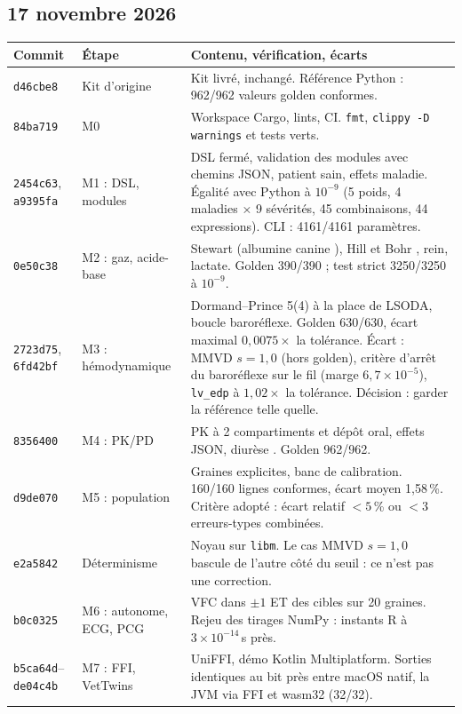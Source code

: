 \documentclass[11pt,a4paper]{article}
\newcommand{\commit}[1]{\texttt{\small #1}}
\newcommand{\ecart}[1]{\textcolor{red!60!black}{#1}}
\begin{document}
\subsection*{17 novembre 2026}
\begin{longtable}{@{}p{1.5cm}p{4.2cm}p{10.3cm}@{}}
\toprule
\textbf{Commit} & \textbf{Étape} & \textbf{Contenu, vérification, écarts}\\
\midrule\endhead
\commit{d46cbe8} & Kit d'origine & Kit livré, inchangé. Référence Python : 962/962 valeurs golden conformes.\\
\commit{84ba719} & M0 & Workspace Cargo, lints, CI. \texttt{fmt}, \texttt{clippy -D warnings} et tests verts.\\
\commit{2454c63}, \commit{a9395fa} & M1 : DSL, modules & DSL fermé, validation des modules avec chemins JSON, patient sain, effets maladie. Égalité avec Python à $10^{-9}$ (5 poids, 4 maladies × 9 sévérités, 45 combinaisons, 44 expressions). CLI : 4161/4161 paramètres.\\
\commit{0e50c38} & M2 : gaz, acide-base & Stewart (albumine canine \citep{constable2005}), Hill et Bohr \citep{cambier2004}, rein, lactate. Golden 390/390 ; test strict 3250/3250 à $10^{-9}$.\\
\commit{2723d75}, \commit{6fd42bf} & M3 : hémodynamique & Dormand--Prince 5(4) \citep{dormand1980} à la place de LSODA, boucle baroréflexe. Golden 630/630, écart maximal $0{,}0075\times$ la tolérance. \ecart{Écart : MMVD $s=1{,}0$ (hors golden), critère d'arrêt du baroréflexe sur le fil (marge $6{,}7\times10^{-5}$), \texttt{lv\_edp} à $1{,}02\times$ la tolérance.} Décision : garder la référence telle quelle.\\
\commit{8356400} & M4 : PK/PD & PK à 2 compartiments et dépôt oral, effets JSON, diurèse \citep{koh2021,her2020}. Golden 962/962.\\
\commit{d9de070} & M5 : population & Graines explicites, banc de calibration. 160/160 lignes conformes, écart moyen 1,58\,\%. Critère adopté : écart relatif $<5$\,\% ou $<3$ erreurs-types combinées.\\
\commit{e2a5842} & Déterminisme & Noyau sur \texttt{libm}. Le cas MMVD $s=1{,}0$ bascule de l'autre côté du seuil : ce n'est pas une correction.\\
\commit{b0c0325} & M6 : autonome, ECG, PCG & VFC dans $\pm1$ ET des cibles \citep{bogucki2015} sur 20 graines. Rejeu des tirages NumPy : instants R à $3\times10^{-14}$\,s près.\\
\commit{b5ca64d}--\commit{de04c4b} & M7 : FFI, VetTwins & UniFFI, démo Kotlin Multiplatform. Sorties identiques au bit près entre macOS natif, la JVM via FFI et wasm32 (32/32).\\

\end{longtable}
\end{document}
